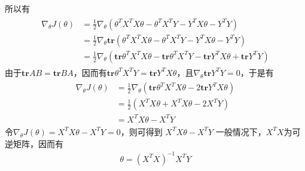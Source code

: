 所以有
\begin{eqnarray}
\begin{aligned}
\nabla_\theta J(\theta)
 &=\frac{1}{2}\nabla_\theta(\theta^TX^TX\theta-\theta^TX^TY-Y^TX\theta-Y^TY)\\
&=\frac{1}{2}\nabla_\theta\textbf{tr}(\theta^TX^TX\theta-\theta^TX^TY-Y^TX\theta-Y^TY)\\
&=\frac{1}{2}\nabla_\theta(\textbf{tr}\theta^TX^TX\theta-\textbf{tr}\theta^TX^TY-\textbf{tr}Y^TX\theta+\textbf{tr}Y^TY)
\end{aligned}
\end{eqnarray}
由于$\textbf{tr}AB=\textbf{tr}BA$，因而有$\textbf{tr}\theta^TX^TY=\textbf{tr}Y^TX\theta$，且$\nabla_\theta\textbf{tr}Y^TY=0$，于是有
\begin{eqnarray}
\begin{aligned}
\nabla_\theta J(\theta)&=\frac{1}{2}\nabla_\theta(\textbf{tr}\theta^TX^TX\theta-2\textbf{tr}Y^TX\theta)\\
&=\frac{1}{2}(X^TX\theta+X^TX\theta-2X^TY)\\
&=X^TX\theta-X^TY
\end{aligned}
\end{eqnarray}
令$\nabla_\theta J(\theta)=X^TX\theta-X^TY=0$，则可得到
$X^TX\theta-X^TY$
一般情况下，$X^TX$为可逆矩阵，因而有
\begin{eqnarray}
\theta=(X^TX)^{-1}X^TY
\end{eqnarray}

